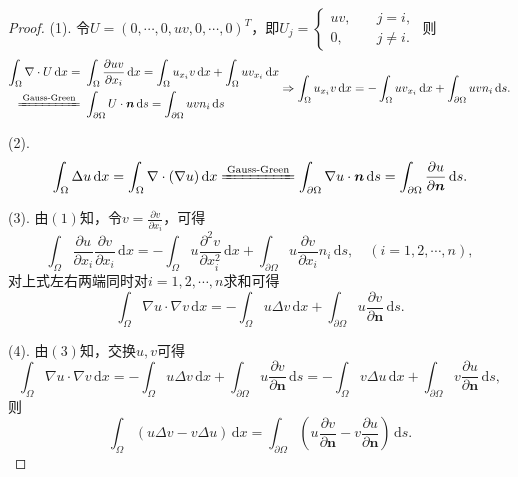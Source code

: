 \documentclass[12pt, a4paper, oneside]{ctexart}
\def\bd{\boldsymbol}        %
\def\d{\mathrm{d}}          %
\begin{document}
\begin{proof}
    (1). 令$U = (0,\cdots, 0, uv, 0,\cdots, 0)^T$，即$U_j = \begin{cases}uv,&\quad j=i,\\ 0,&\quad j\neq i.\end{cases}$ 则
    \begin{equation*}
        \begin{aligned}
            \int_{\Omega}\nabla\cdot U\,\d x =&\ \int_{\Omega}\frac{\partial uv}{\partial x_i}\,\d x=\int_{\Omega}u_{x_i}v\,\d x+\int_{\Omega}uv_{x_{i}}\,\d x\\
            \xlongequal{\text{Gauss-Green}}&\ \int_{\partial \Omega}U\cdot \bd{n}\,\d s=\int_{\partial \Omega}uvn_i\,\d s\\
        \end{aligned}\Rightarrow
        \int_{\Omega}u_{x_i}v\,\d x=-\int_{\Omega}uv_{x_i}\,\d x+\int_{\partial\Omega}uvn_i\,\d s.
    \end{equation*}

    (2). \begin{equation*}
        \int_{\Omega}\Delta u\,\d x=\int_{\Omega}\nabla\cdot(\nabla u)\,\d x \xlongequal{\text{Gauss-Green}}\int_{\partial \Omega}\nabla u\cdot \bd{n}\,\d s = \int_{\partial \Omega}\frac{\partial u}{\partial \bd{n}}\,\d s.
    \end{equation*}

    (3). 由$(1)$知，令$v=\frac{\partial v}{\partial x_i}$，可得
    \begin{equation*}
        \int_{\Omega}\frac{\partial u}{\partial x_i}\frac{\partial v}{\partial x_i}\,\d x =-\int_{\Omega}u\frac{\partial^2 v}{\partial x_i^2}\,\d x+\int_{\partial \Omega}u\frac{\partial v}{\partial x_i}n_i\,\d s,\quad(i=1,2,\cdots, n),
    \end{equation*}
    对上式左右两端同时对$i=1,2,\cdots, n$求和可得
    \begin{equation*}
        \int_{\Omega}\nabla u\cdot \nabla v\,\d x = -\int_{\Omega}u\Delta v\,\d x+\int_{\partial \Omega}u\frac{\partial v}{\partial \bd{n}}\,\d s.
    \end{equation*}

    (4). 由$(3)$知，交换$u, v$可得
    \begin{equation*}
        \int_{\Omega}\nabla u\cdot \nabla v\,\d x = -\int_{\Omega}u\Delta v\,\d x+\int_{\partial \Omega}u\frac{\partial v}{\partial \bd{n}}\,\d s=-\int_{\Omega}v\Delta u\,\d x+\int_{\partial \Omega}v\frac{\partial u}{\partial \bd{n}}\,\d s,
    \end{equation*}
    则
    \begin{equation*}
        \int_{\Omega}(u\Delta v-v\Delta u)\,\d x =\int_{\partial \Omega}\left(u\frac{\partial v}{\partial \bd{n}}-v\frac{\partial u}{\partial \bd{n}}\right)\,\d s.
    \end{equation*}
\end{proof}
\end{document}
